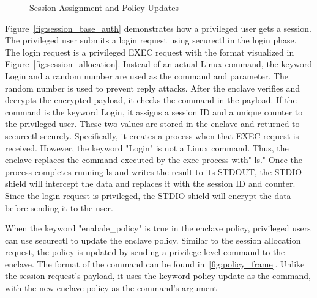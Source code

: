 \begin{figure}[!htb]
\begin{minipage}{0.9\textwidth}
\begin{subcolumns}[0.62\textwidth]
    \nextsubfigure
    \end{subcolumns}
    \end{minipage}
    
    \caption[Session Assignment and Policy Updates]{Session Assignment and Policy Updates}
    \label{fig:session_policy}
\end{figure}


Figure~\ref{fig:session_base_auth} demonstrates how a privileged user gets a session. The privileged user submits a login request using securectl in the login phase. The login request is a privileged EXEC request with the format visualized in Figure~\ref{fig:session_allocation}. Instead of an actual Linux command, the keyword Login and a random number 
are used as the command and parameter. The random number is used to prevent reply attacks. After the enclave verifies and decrypts the encrypted payload, it checks the command in the payload. If the command is the keyword Login, it assigns a session ID and a unique counter to the privileged user. 
These two values are stored in the enclave and returned to securectl securely. Specifically, it creates a process when that EXEC request is received. However, the keyword "Login" is not a Linux command. Thus, the enclave replaces the command executed by the exec process with" ls." Once the process 
completes running ls and writes the result to its STDOUT, the STDIO shield will intercept the data and replaces it with the session ID and counter. Since the login request is privileged, the STDIO shield will encrypt the data before sending it to the user. 

When the keyword "enabale\_policy" is true in the enclave policy, privileged users can use securectl to update the enclave policy. Similar to the session allocation request, the policy is updated by sending a privilege-level command to the enclave. The format of the command can be found in~\ref{fig:policy_frame}. Unlike 
the session request's payload, it uses the keyword policy-update as the command, with the new enclave policy as the command's argument

